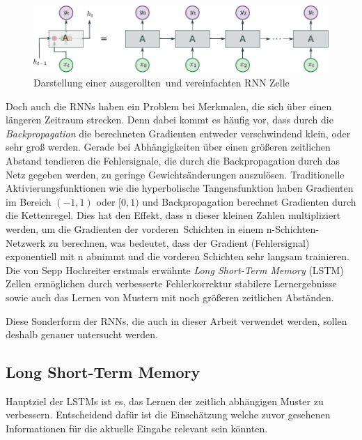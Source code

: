                 \begin{figure}[ht]
                    \centering
                    \includegraphics[width=1\textwidth]{images/Illustrationen/RNN_enrolled}
                    \caption{Darstellung einer \glqq ausgerollten\grqq \ und vereinfachten RNN Zelle}
                    \label{fig:RNN_enroled}
                \end{figure}
            Doch auch die RNNs haben ein Problem bei Merkmalen, die sich über einen längeren Zeitraum strecken.
            Denn dabei kommt es häufig vor, dass durch die \textit{Backpropagation} die berechneten Gradienten entweder verschwindend klein, oder sehr groß werden.
            Gerade bei Abhängigkeiten über einen größeren zeitlichen Abstand tendieren die Fehlersignale,
            die durch die Backpropagation durch das Netz gegeben werden, zu geringe Gewichtsänderungen auszulösen.
            Traditionelle Aktivierungsfunktionen wie die hyperbolische Tangensfunktion haben Gradienten im Bereich $(-1,1)$ oder $[0,1)$ und Backpropagation berechnet Gradienten durch die Kettenregel.
            Dies hat den Effekt, dass n dieser kleinen Zahlen multipliziert werden, um die Gradienten der \glqq vorderen\grqq \ Schichten in einem n-Schichten-Netzwerk zu berechnen, was bedeutet, dass der Gradient (Fehlersignal) exponentiell mit n abnimmt und die vorderen Schichten sehr langsam trainieren.
            Die von Sepp Hochreiter erstmals erwähnte \textit{Long Short-Term Memory} (LSTM) Zellen ermöglichen durch verbesserte Fehlerkorrektur stabilere Lernergebnisse sowie auch das Lernen von Mustern mit noch größeren zeitlichen Abständen.~\cite{HOCHREITER1998}

            Diese Sonderform der RNNs, die auch in dieser Arbeit verwendet werden, sollen deshalb genauer untersucht werden.
   	
        \subsection{Long Short-Term Memory} 
            Hauptziel der LSTMs ist es, das Lernen der zeitlich abhängigen Muster zu verbessern.
            Entscheidend dafür ist die Einschätzung welche zuvor gesehenen Informationen für die aktuelle Eingabe relevant sein könnten.
            
